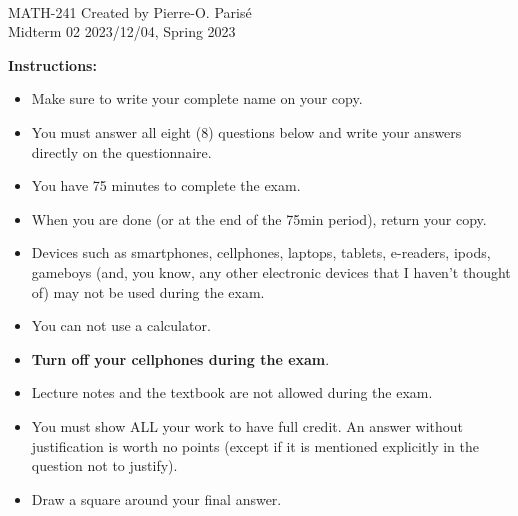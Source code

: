 \documentclass[addpoints, 12pt]{exam}%
\theoremstyle{definition}
\begin{document}
	\noindent \hrulefill \\
	\noindent MATH-241 \hfill Created by Pierre-O. Paris{\'e}\\
	Midterm 02 \hfill 2023/12/04, Spring 2023\\\vspace*{-0.7cm}

\noindent\hrulefill
	
\vspace*{1cm}

\noindent{}

\vspace*{0.5cm}

\noindent{}

\vspace*{0.5cm}

\noindent{}

\vspace*{1cm}

\noindent\textbf{Instructions:} 

\begin{itemize}
\item Make sure to write your complete name on your copy. 
\item You must answer all eight (8) questions below and write your answers directly on the questionnaire.
\item You have 75 minutes to complete the exam.
\item When you are done (or at the end of the 75min period), return your copy. 
\item Devices such as smartphones, cellphones, laptops, tablets, e-readers, ipods, gameboys (and, you know, any other electronic devices that I haven't thought of) may not be used during the exam. 
\item You can not use a calculator.
\item \textbf{Turn off your cellphones during the exam}.
\item Lecture notes and the textbook are not allowed during the exam. 
\item You must show ALL your work to have full credit. An answer without justification is worth no points (except if it is mentioned explicitly in the question not to justify).
\item Draw a square around your final answer.
\end{itemize}
\end{document}
